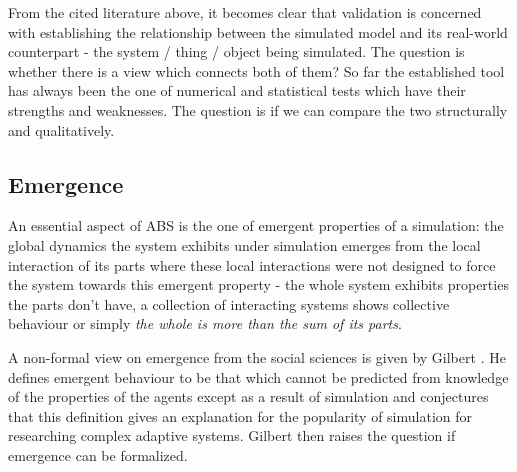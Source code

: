 From the cited literature above, it becomes clear that validation is concerned with establishing the relationship between the simulated model and its real-world counterpart - the system / thing / object being simulated. The question is whether there is a view which connects both of them? So far the established tool has always been the one of numerical and statistical tests which have their strengths and weaknesses. The question is if we can compare the two structurally and qualitatively. 

\subsection{Emergence}
An essential aspect of ABS is the one of emergent properties of a simulation: the global dynamics the system exhibits under simulation emerges from the local interaction of its parts where these local interactions were not designed to force the system towards this emergent property - the whole system exhibits properties the parts don't have, a collection of interacting systems shows collective behaviour \cite{baas_emergence_1997} or simply \textit{the whole is more than the sum of its parts}.

A non-formal view on emergence from the social sciences is given by Gilbert \cite{gilbert_holism_1996}. He defines emergent behaviour to be that which cannot be predicted from knowledge of the properties of the agents except as a result of simulation and conjectures that this definition gives an explanation for the popularity of simulation for researching complex adaptive systems. Gilbert then raises the question if emergence can be formalized.

